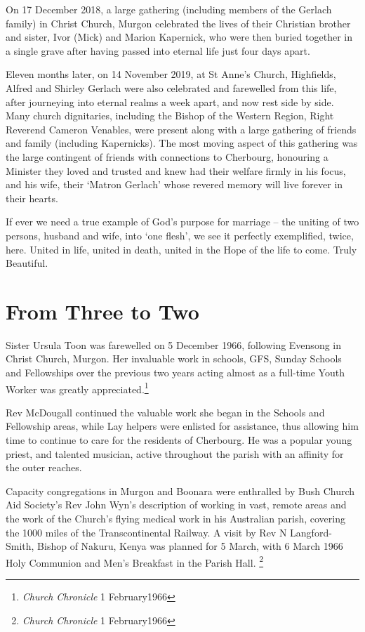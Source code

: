 On 17 December 2018, a large gathering (including members of the Gerlach family) in Christ Church, Murgon celebrated the lives of their Christian brother and sister, Ivor (Mick) and Marion Kapernick, who were then buried together in a single grave after having passed into eternal life just four days apart.



Eleven months later, on 14 November 2019, at St Anne's Church, Highfields, Alfred and Shirley Gerlach were also celebrated and farewelled from this life, after journeying into eternal realms a week apart, and now rest side by side. Many church dignitaries, including the Bishop of the Western Region, Right Reverend Cameron Venables, were present along with a large gathering of friends and family (including Kapernicks). The most moving aspect of this gathering was the large contingent of friends with connections to Cherbourg, honouring a Minister they loved and trusted and knew had their welfare firmly in his focus, and his wife, their `Matron Gerlach' whose revered memory will live forever in their hearts.



If ever we need a true example of God's purpose for marriage -- the uniting of two persons, husband and wife, into `one flesh', we see it perfectly exemplified, twice, here. United in life, united in death, united in the Hope of the life to come. Truly Beautiful.



\section{From Three to Two}



Sister Ursula Toon was farewelled on 5 December 1966, following Evensong in Christ Church, Murgon. Her invaluable work in schools, GFS, Sunday Schools and Fellowships over the previous two years acting almost as a full-time Youth Worker was greatly appreciated.\footnote{\emph{Church Chronicle} 1 February1966}


Rev McDougall continued the valuable work she began in the Schools and Fellowship areas, while Lay helpers were enlisted for assistance, thus allowing him time to continue to care for the residents of Cherbourg. He was a popular young priest, and talented musician, active throughout the parish with an affinity for the outer reaches.



Capacity congregations in Murgon and Boonara were enthralled by Bush Church Aid Society's Rev John Wyn's description of working in vast, remote areas and the work of the Church's flying medical work in his Australian parish, covering the 1000 miles of the Transcontinental Railway. A visit by Rev N Langford-Smith, Bishop of Nakuru, Kenya was planned for 5 March, with 6 March 1966 Holy Communion and Men's Breakfast in the Parish Hall. \footnote{\emph{Church Chronicle} 1 February1966}


